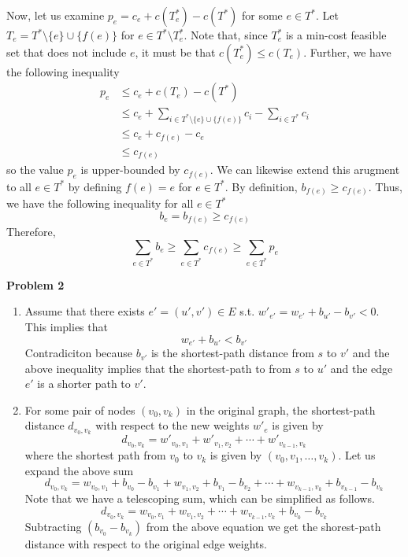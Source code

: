\documentclass[a4paper]{/Users/dawei/.dotfiles/templates/preamble}
\begin{document}
Now, let us examine $p_e = c_e + c(T^*_e) - c(T^*)$ for some $e \in T^*$. Let
$T_e = T^* \setminus \{e\} \cup \{f(e)\}$ for $e \in T^* \setminus T^*_e$. Note
that, since $T^*_e$ is a min-cost feasible set that does not include $e$, it
must be that $c(T^*_e) \le c(T_e)$. Further, we have the following inequality
\begin{align*}
  p_e &\le c_e + c(T_e) - c(T^*) \\
      &\le c_e + \sum_{i \in T^* \setminus \{e\} \cup \{f(e)\}} c_i - \sum_{i \in T^*} c_i\\
      &\le c_e + c_{f(e)} - c_e \\
      &\le c_{f(e)}
\end{align*}
so the value $p_e$ is upper-bounded by $c_{f(e)}$.
We can likewise extend this arugment to all $e \in T^*$ by defining $f(e) = e$
for $e \in T^*$. By definition, $b_{f(e)} \ge c_{f(e)}$. Thus, we have the
following inequality for all $e \in T^*$
\[
  b_e = b_{f(e)} \ge c_{f(e)}
\]
Therefore,
\[
  \sum_{e \in T^*} b_e \ge \sum_{e \in T^*} c_{f(e)} \ge \sum_{e \in T^*} p_e
\]

\noindent\textbf{Problem 2}
\begin{enumerate}[label = (\alph*)]
  \item Assume that there exists $e' = (u',v') \in E$ s.t. $w'_{e'} = w_{e'} + b_{u'} - b_{v'} < 0$.
    This implies that
    \[
      w_{e'} + b_{u'} < b_{v'}
    \]
    Contradiciton because $b_{v'}$ is the shortest-path distance from $s$ to $v'$ and
    the above inequality implies that the shortest-path to from $s$ to $u'$ and the edge $e'$ is
    a shorter path to $v'$.
  \item For some pair of nodes $(v_0,v_k)$ in the original graph, the shortest-path
    distance $d_{v_0,v_k}$ with respect to the new weights $w'_e$ is given by
    \[
      d_{v_0,v_k} = w'_{v_0, v_1} + w'_{v_1, v_2} + \cdots + w'_{v_{k-1},v_k}
    \]
    where the shortest path from $v_0$ to $v_k$ is given by $(v_0, v_1, \dots, v_k)$.
    Let us expand the above sum
    \[
      d_{v_0,v_k} = w_{v_0, v_1} + b_{v_0} - b_{v_1} + w_{v_1, v_2} + b_{v_1} - b_{v_2} + \cdots + w_{v_{k-1}, v_k} + b_{v_{k-1}} - b_{v_k} 
    \]
    Note that we have a telescoping sum, which can be simplified as follows.
    \[
      d_{v_0,v_k} = w_{v_0, v_1} + w_{v_1, v_2}  + \cdots + w_{v_{k-1}, v_k} + b_{v_0} - b_{v_k} 
    \]
    Subtracting $(b_{v_0} - b_{v_k})$ from the above equation we get the shorest-path
    distance with respect to the original edge weights.
\end{enumerate}
\end{document}
